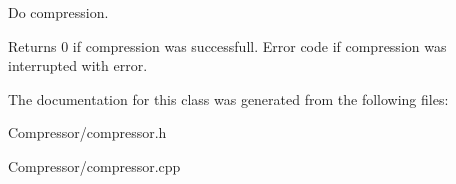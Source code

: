 Do compression. 

\begin{DoxyReturn}{Returns}
0 if compression was successfull. Error code if compression was interrupted with error. 
\end{DoxyReturn}


The documentation for this class was generated from the following files\+:\begin{DoxyCompactItemize}
\item 
Compressor/compressor.\+h\item 
Compressor/compressor.\+cpp\end{DoxyCompactItemize}
